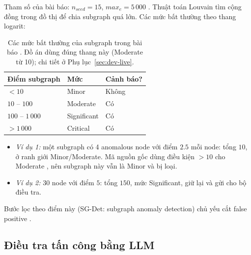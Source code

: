 Tham số của bài báo: $n_{seed} = 15$, $max_e = 5\,000$ \cite[§7.2.1]{aly2025ocrapt}. Thuật toán Louvain \cite{blondel2008louvain} tìm cộng đồng trong đồ thị để chia subgraph quá lớn. Các mức bất thường theo thang logarit:

\begin{table}[H]
\centering
\begin{tabular}{l l l}
\toprule
\textbf{Điểm subgraph} & \textbf{Mức} & \textbf{Cảnh báo?} \\
\midrule
$< 10$ & Minor & Không \\
$10$ -- $100$ & Moderate & Có \\
$100$ -- $1\,000$ & Significant & Có \\
$> 1\,000$ & Critical & Có \\
\bottomrule
\end{tabular}
\caption{Các mức bất thường của subgraph trong bài báo \cite[§7.2.1]{aly2025ocrapt}. Đồ án dùng đúng thang này (Moderate từ 10); chi tiết ở Phụ lục~\ref{sec:dev-live}.}
\label{tab:levels}
\end{table}

\begin{itemize}
    \item \emph{Ví dụ 1:} một subgraph có 4 anomalous node với điểm $2.5$ mỗi node: tổng $10$, ở ranh giới Minor/Moderate. Mã nguồn gốc dùng điều kiện $> 10$ cho Moderate \cite{ocrapt_repo}, nên subgraph này vẫn là Minor và bị loại.
    \item \emph{Ví dụ 2:} 30 node với điểm $5$: tổng $150$, mức Significant, giữ lại và gửi cho bộ điều tra.
\end{itemize}
Bước lọc theo điểm này (SG-Det: subgraph anomaly detection) chủ yếu cắt false positive \cite[§7.4]{aly2025ocrapt}.

\subsection{Điều tra tấn công bằng LLM}
\label{sec:theory-llm}

